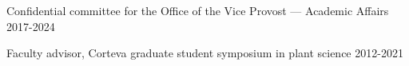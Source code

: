 \documentclass[letterpaper,10pt]{article}
\renewenvironment{itemize}{
  \begin{list}{}{
    \setlength{\leftmargin}{1.5em}
  }
}{
  \end{list}
}
\begin{document}
\begin{itemize}
\item Confidential committee for the Office of the Vice Provost --- Academic Affairs  \hfill2017-2024 %
\item Faculty advisor, Corteva graduate student symposium in plant science \hfill2012-2021



\end{itemize}
\end{document}
